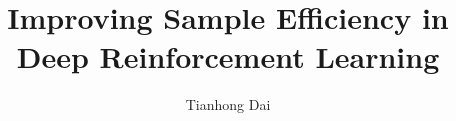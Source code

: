 \documentclass[a4paper,12pt,twoside]{report}
\begin{document}
\title{\LARGE {\bf Improving Sample Efficiency in Deep Reinforcement Learning}\\
 \vspace*{6mm}
}

\author{Tianhong Dai}

\normallinespacing
\maketitle

\preface






\body








\appendix

%


\end{document}
